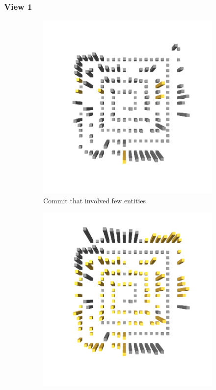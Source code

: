 \subsubsection*{View 1}
\begin{figure}[t!]
    \begin{subfigure}{0.42\textwidth}
        \includegraphics[width=\linewidth]{JetUML_V0E0.png}
        \caption{Commit that involved few entities} \label{fig:JetUML_V0E0}
    \end{subfigure}
    \hspace*{\fill}
    \begin{subfigure}{0.42\textwidth}
        \includegraphics[width=\linewidth]{JetUML_V0E1.png}

\end{subfigure}
\end{figure}
